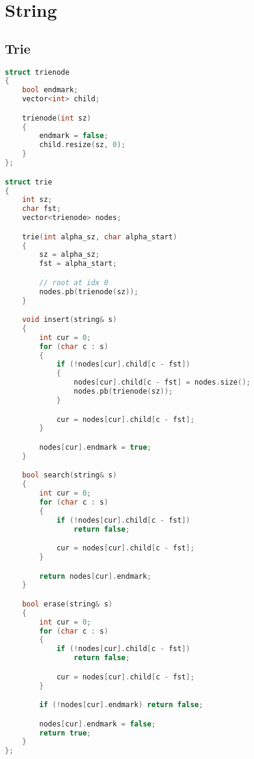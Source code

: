 \chapter{String}

\section{Trie}
\begin{lstlisting}[language=C++]
struct trienode
{
    bool endmark;
    vector<int> child;

    trienode(int sz)
    {
        endmark = false;
        child.resize(sz, 0);
    }
};

struct trie
{
    int sz;
    char fst;
    vector<trienode> nodes;

    trie(int alpha_sz, char alpha_start)
    {
        sz = alpha_sz;
        fst = alpha_start;

        // root at idx 0
        nodes.pb(trienode(sz));
    }

    void insert(string& s)
    {
        int cur = 0;
        for (char c : s)
        {
            if (!nodes[cur].child[c - fst])
            {
                nodes[cur].child[c - fst] = nodes.size();
                nodes.pb(trienode(sz));
            }

            cur = nodes[cur].child[c - fst];
        }

        nodes[cur].endmark = true;
    }

    bool search(string& s)
    {
        int cur = 0;
        for (char c : s)
        {
            if (!nodes[cur].child[c - fst])
                return false;

            cur = nodes[cur].child[c - fst];
        }

        return nodes[cur].endmark; 
    }

    bool erase(string& s)
    {
        int cur = 0;
        for (char c : s)
        {
            if (!nodes[cur].child[c - fst])
                return false;

            cur = nodes[cur].child[c - fst];
        }

        if (!nodes[cur].endmark) return false;

        nodes[cur].endmark = false;
        return true;
    }
};
\end{lstlisting}
\sectionend